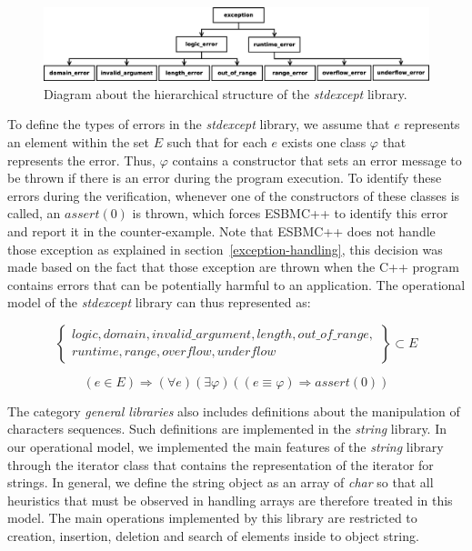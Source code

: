 \documentclass[a4paper]{llncs}
\begin{document}
\begin{figure}[ht]
\centering
\includegraphics[scale=0.23]{figures/stdexcept.eps}
\caption{Diagram about the hierarchical structure of the \textit{stdexcept} library.}
\label{figure:stdexcept}
\end{figure}

To define the types of errors in the \textit{stdexcept} library, we assume that
$e$ represents an element within the set $E$ such that for each $e$ exists one class
$\varphi$ that represents the error. Thus, $\varphi$ contains a constructor that sets an
error message to be thrown if there is an error during the program execution.
To identify these errors during the verification, whenever one of the
constructors of these classes is called, an $assert(0)$ is thrown, which forces ESBMC++ to
identify this error and report it in the counter-example. Note that ESBMC++
does not handle those exception as explained in section~\ref{exception-handling}, this
decision was made based on the fact that those exception are thrown when the C++ program
contains errors that can be potentially harmful to an application. The operational model
of the \textit{stdexcept} library can thus represented as:

\begin{equation}
\label{kind-of-exceptions}
\left\{ \begin{array}{ll}
              logic, domain, invalid\_argument, length, out\_of\_range,\\ runtime, range, overflow, underflow
        \end{array} \right\} \subset E
\end{equation}


\begin{equation}
\label{stdexcept}
\left( e \in E \right)
\Rightarrow \left(\forall e\right)\left(\exists\varphi\right)\left(\left(e\equiv\varphi\right)
\Rightarrow assert\left(0\right)\right)
\end{equation}

The category \textit{general libraries} also includes definitions
about the manipulation of characters sequences. Such definitions
are implemented in the \textit{string} library. In our operational
model, we implemented the main features of the \textit{string}
library through the iterator class that contains the
representation of the iterator for strings. In general,
we define the string object as an array of \textit{char} so that all
heuristics that must be observed in handling arrays are therefore
treated in this model. The main operations implemented by this library
are restricted to creation, insertion, deletion and search of elements
inside to object string.
\end{document}
